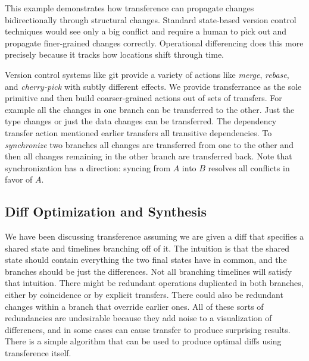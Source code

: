 \documentclass[english,submission]{programming}
\theoremstyle{definition}
\newcommand{\mathbox}[1]{\colorbox{black!10}{$#1$\phantom{i\hspace{-3.5pt}}}}
\begin{document}
This example demonstrates how transference can propagate changes bidirectionally through structural changes. Standard state-based version control techniques would see only a big conflict and require a human to pick out and propagate finer-grained changes correctly.
Operational differencing does this more precisely because it tracks how locations shift through time.

Version control systems like git provide a variety of actions like \textit{merge}, \textit{rebase}, and \textit{cherry-pick} with subtly different effects. We provide transferrance as the sole primitive and then build coarser-grained actions out of sets of transfers. For example all the changes in one branch can be transferred to the other. Just the type changes or just the data changes can be transferred. The dependency transfer action mentioned earlier transfers all transitive dependencies. To \textit{synchronize} two branches all changes are transferred from one to the other and then all changes remaining in the other branch are transferred back. Note that synchronization has a direction: syncing from \mathbox{A} into \mathbox{B} resolves all conflicts in favor of \mathbox{A}.


\subsection{Diff Optimization and Synthesis}\label{diff-synth}

We have been discussing transference assuming we are given a diff that specifies a shared state and timelines branching off of it. The intuition is that the shared state should contain everything the two final states have in common, and the branches should be just the differences. Not all branching timelines will satisfy that intuition. There might be redundant operations duplicated in both branches, either by coincidence or by explicit transfers. There could also be redundant changes within a branch that override earlier ones. All of these sorts of redundancies are undesirable because they add noise to a visualization of differences, and in some cases can cause transfer to produce surprising results. There is a simple algorithm that can be used to produce optimal diffs using transference itself.
\end{document}
